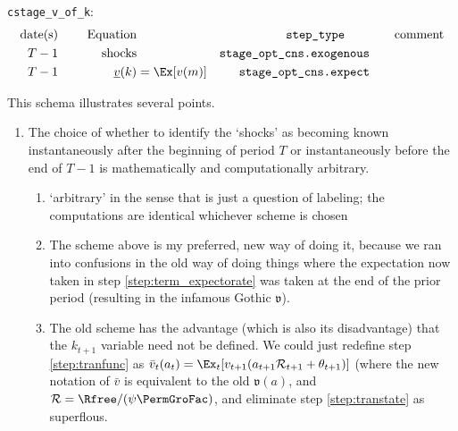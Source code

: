 \documentclass[\econtexRoot/BufferStockTheory]{subfiles}
\newcommand{\EOP}{\bar}
\newcommand{\MOP}{}
\newcommand{\BOP}{\underline}
\begin{document}
\texttt{cstage\_v\_of\_k}:
\begin{alignat}{3}
\text{date(s)}              &      &   \notag \text{Equation} & \qquad                          & \qquad \texttt{step\_type} \qquad & \qquad \text{comment}
\\ T-1                    & ~~~~ & \text{shocks}    &                                 & \texttt{stage\_opt\_cns.exogenous}          & \label{step:stage_exogenous}
\\ T-1                    & ~~~~ & \BOP{v}(k) & = \Ex[\MOP{v}(m)]                     & \texttt{stage\_opt\_cns.expect}          & \label{step:stage_expectorate}
\end{alignat}


This schema illustrates several points.


\begin{enumerate}
\item The choice of whether to identify the `shocks' as becoming known instantaneously after the beginning of period $T$ or instantaneously before the end of $T-1$ is mathematically and computationally arbitrary.
  \begin{enumerate}
    \item `arbitrary' in the sense that is just a question of labeling; the computations are identical whichever scheme is chosen
  \item The scheme above is my preferred, new way of doing it, because we ran into confusions in the old way of doing things where the expectation now taken in step \ref{step:term_expectorate} was taken at the end of the prior period (resulting in the infamous Gothic $\mathfrak{v}$).  
    \item The old scheme has the advantage (which is also its disadvantage) that the $k_{t+1}$ variable need not be defined.  We could just redefine step \ref{step:tranfunc} as $\EOP{v}_{t}(a_{t}) = \Ex_{t}[\MOP{v}_{t+1}(a_{t+1} \mathcal{R}_{t+1} + \theta_{t+1})]$ (where the new notation of $\EOP{v}$ is equivalent to the old $\mathfrak{v}(a)$, and $\mathcal{R}=\Rfree / (\psi \PermGroFac)$, and eliminate step \ref{step:transtate} as superflous.  

  \end{enumerate}

\pagebreak


\end{enumerate}
\end{document}
